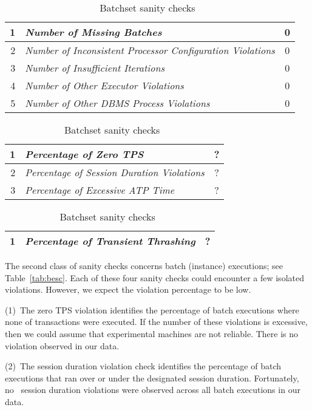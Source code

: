\begin{table}[t]
{
\centering
\begin{tabular}{|r|l|c|}
\hline 
1 & {\em Number of Missing Batches} & 0\\ 
\hline 
2 & {\em Number of Inconsistent Processor Configuration Violations} & 0\\ 
\hline 
3 & {\em Number of Insufficient Iterations} & 0 \\ 
\hline 
4 & {\em Number of Other Executor Violations} & 0 \\ 
\hline 
5 & {\em Number of Other DBMS Process Violations}  & 0\\
\hline
\end{tabular}
\caption{Experiment-wide sanity checks~\label{tab:ewc}}
}
\vspace{2ex}
{
\centering
\begin{tabular}{|r|l|c|}
\hline
1 & {\em Percentage of Zero TPS}  & ?\\
\hline
2 & {\em Percentage of Session Duration Violations} & ?\\
\hline
3 & {\em Percentage of Excessive ATP Time} & ?\\ \hline
\end{tabular}
\caption{Batch execution sanity checks~\label{tab:besc}}
}
\vspace{2ex}
{
\centering
\begin{tabular}{|r|l|c|} \hline
1 & {\em Percentage of Transient Thrashing} & ?\\
\hline
\end{tabular}
\caption{Batchset sanity checks~\label{tab:bsec}}
}
\end{table}


The second class of sanity checks concerns batch (instance) executions; see Table~\ref{tab:besc}. 
Each of these four sanity checks could encounter a few isolated violations.
However, we expect the violation percentage to be low.  

(1)~The zero TPS violation identifies the percentage of batch executions where 
none of transactions were executed. 
If the number of these violations is excessive, then we could assume that experimental machines 
are not reliable. 
There is no violation  observed in our data.

%
(2)~The session duration violation check identifies the percentage of batch executions 
that ran over or under the designated session duration. 
Fortunately, no \ session duration violations were
observed across all batch executions in our data.

